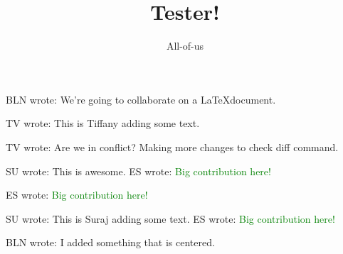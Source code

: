 \documentclass[12pt]{article}
\title{Tester!}
\author{All-of-us}
\newcommand{\bln}[1]{BLN wrote: \textcolor{red!70!blue!70}{#1}}
\newcommand{\tv}[1]{TV wrote: \textcolor{blue!70}{#1}}
\newcommand{\su}[1]{SU wrote: \textcolor{green!70}{#1}}
\newcommand{\es}[1]{ES wrote: \textcolor{green}{#1}}
\begin{document}
\maketitle

\bln{We're going to collaborate on a \LaTeX document.}

\tv{This is Tiffany adding some text.}

\tv{Are we in conflict? Making more changes to check diff command.}

\su{This is awesome.}
\es{Big contribution here!}



\es{Big contribution here!}

\su{This is Suraj adding some text.}
\es{Big contribution here!}

\begin{center}
  \bln{I added something that is centered.}
\end{center}
\end{document}
